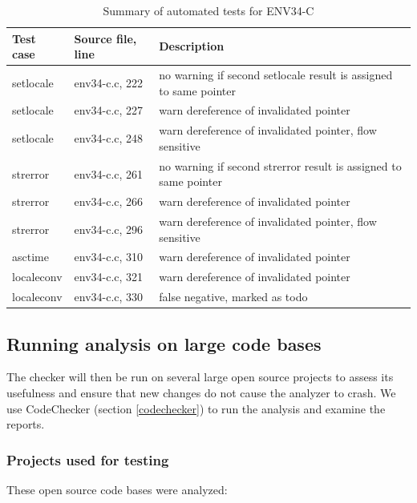 \begin{table}[H]
	\centering
	\begin{tabular}{ | m{} | m{} | m{} |}
		\hline
		\textbf{Test case} & \textbf{Source file, line} & \textbf{Description} \\
		\hline \hline
		setlocale & env34-c.c, 222 & no warning if second setlocale result is assigned to same pointer\\
		\hline
		setlocale & env34-c.c, 227 & warn dereference of invalidated pointer\\
		\hline
		setlocale & env34-c.c, 248 & warn dereference of invalidated pointer, flow sensitive\\
		\hline
		strerror & env34-c.c, 261 & no warning if second strerror result is assigned to same pointer\\
		\hline
		strerror & env34-c.c, 266 & warn dereference of invalidated pointer\\
		\hline
		strerror & env34-c.c, 296 & warn dereference of invalidated pointer, flow sensitive\\
		\hline
		asctime & env34-c.c, 310 & warn dereference of invalidated pointer\\
		\hline
		localeconv & env34-c.c, 321 & warn dereference of invalidated pointer\\
		\hline
		localeconv & env34-c.c, 330 & false negative, marked as todo\\
		\hline
	\end{tabular}
	\caption{Summary of automated tests for ENV34-C}
	\label{tab:tests4}
\end{table}

\subsection{Running analysis on large code bases} \label{codebases}

The checker will then be run on several large open source projects to assess its usefulness and ensure that new changes do not cause the analyzer to crash. We use CodeChecker (section \ref{codechecker}) to run the analysis and examine the reports. 

\subsubsection{Projects used for testing}
These open source code bases were analyzed: 

